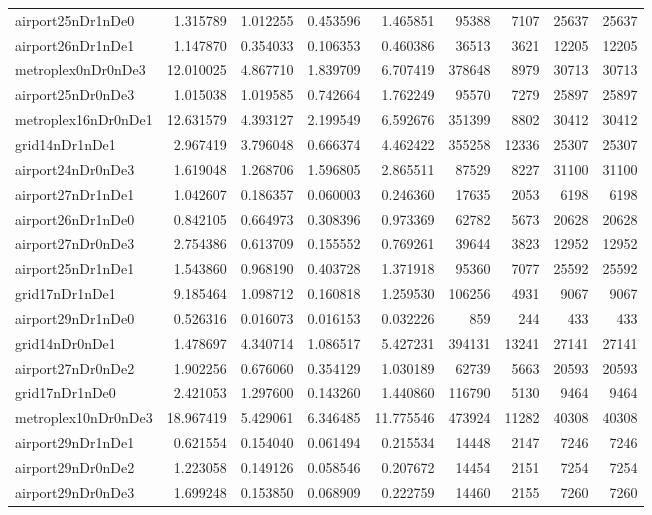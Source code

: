 \begin{longtable}{|l|r|r|r|r|r|r|r|r|}
airport25nDr1nDe0 & 1.315789 & 1.012255 & 0.453596 & 1.465851 & 95388 & 7107 & 25637 & 25637 \\
airport26nDr1nDe1 & 1.147870 & 0.354033 & 0.106353 & 0.460386 & 36513 & 3621 & 12205 & 12205 \\
metroplex0nDr0nDe3 & 12.010025 & 4.867710 & 1.839709 & 6.707419 & 378648 & 8979 & 30713 & 30713 \\
airport25nDr0nDe3 & 1.015038 & 1.019585 & 0.742664 & 1.762249 & 95570 & 7279 & 25897 & 25897 \\
metroplex16nDr0nDe1 & 12.631579 & 4.393127 & 2.199549 & 6.592676 & 351399 & 8802 & 30412 & 30412 \\
grid14nDr1nDe1 & 2.967419 & 3.796048 & 0.666374 & 4.462422 & 355258 & 12336 & 25307 & 25307 \\
airport24nDr0nDe3 & 1.619048 & 1.268706 & 1.596805 & 2.865511 & 87529 & 8227 & 31100 & 31100 \\
airport27nDr1nDe1 & 1.042607 & 0.186357 & 0.060003 & 0.246360 & 17635 & 2053 & 6198 & 6198 \\
airport26nDr1nDe0 & 0.842105 & 0.664973 & 0.308396 & 0.973369 & 62782 & 5673 & 20628 & 20628 \\
airport27nDr0nDe3 & 2.754386 & 0.613709 & 0.155552 & 0.769261 & 39644 & 3823 & 12952 & 12952 \\
airport25nDr1nDe1 & 1.543860 & 0.968190 & 0.403728 & 1.371918 & 95360 & 7077 & 25592 & 25592 \\
grid17nDr1nDe1 & 9.185464 & 1.098712 & 0.160818 & 1.259530 & 106256 & 4931 & 9067 & 9067 \\
airport29nDr1nDe0 & 0.526316 & 0.016073 & 0.016153 & 0.032226 & 859 & 244 & 433 & 433 \\
grid14nDr0nDe1 & 1.478697 & 4.340714 & 1.086517 & 5.427231 & 394131 & 13241 & 27141 & 27141 \\
airport27nDr0nDe2 & 1.902256 & 0.676060 & 0.354129 & 1.030189 & 62739 & 5663 & 20593 & 20593 \\
grid17nDr1nDe0 & 2.421053 & 1.297600 & 0.143260 & 1.440860 & 116790 & 5130 & 9464 & 9464 \\
metroplex10nDr0nDe3 & 18.967419 & 5.429061 & 6.346485 & 11.775546 & 473924 & 11282 & 40308 & 40308 \\
airport29nDr1nDe1 & 0.621554 & 0.154040 & 0.061494 & 0.215534 & 14448 & 2147 & 7246 & 7246 \\
airport29nDr0nDe2 & 1.223058 & 0.149126 & 0.058546 & 0.207672 & 14454 & 2151 & 7254 & 7254 \\
airport29nDr0nDe3 & 1.699248 & 0.153850 & 0.068909 & 0.222759 & 14460 & 2155 & 7260 & 7260 \\

\end{longtable}
